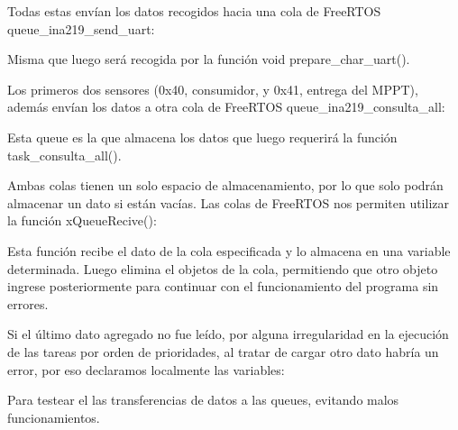                 Todas estas envían los datos recogidos hacia una cola de FreeRTOS queue\_ina219\_send\_uart:\par
                
                \par
                
                Misma que luego será recogida por la función void prepare\_char\_uart().\par
                Los primeros dos sensores (0x40, consumidor, y 0x41, entrega del MPPT), además envían los datos a otra cola de FreeRTOS queue\_ina219\_consulta\_all:\par
                
                \par
                
                Esta queue es la que almacena los datos que luego requerirá la función task\_consulta\_all().\par
                Ambas colas tienen un solo espacio de almacenamiento, por lo que solo podrán almacenar un dato si están vacías. Las colas de FreeRTOS nos permiten utilizar la función xQueueRecive():\par

                
                
                Esta función recibe el dato de la cola especificada y lo almacena en una variable determinada. Luego elimina el objetos de la cola, permitiendo que otro objeto ingrese posteriormente para continuar con el funcionamiento del programa sin errores.\par
                Si el último dato agregado no fue leído, por alguna irregularidad en la ejecución de las tareas por orden de prioridades, al tratar de cargar otro dato habría un error, por eso declaramos localmente las variables:\par
                
                \par
                
                Para testear el las transferencias de datos a las queues, evitando malos funcionamientos.\par
                
                
